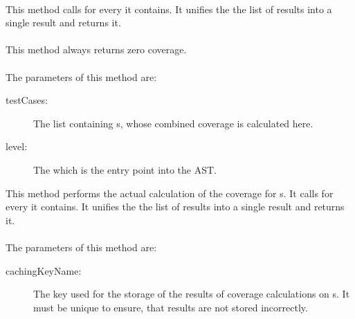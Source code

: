 \paragraph{} \label{Classes:Metrics:AbstractCoverageMetric:getCoverage_branch}
This method calls  for every  it contains. It unifies the the list of results into a single result and returns it.

\paragraph{} \label{Classes:Metrics:AbstractCoverageMetric:getCoverage_term}
This method always returns zero coverage.

\paragraph{} \label{Classes:Metrics:AbstractCoverageMetric:getCoverage_hierarchy_uncached}
The parameters of this method are:
\begin{description}
\item[testCases:] The list containing s, whose combined coverage is calculated here.

\item[level:]  The  which is the entry point into the AST.

\end{description}

This method performs the actual calculation of the coverage for s. It calls  for every  it contains. It unifies the the list of results into a single result and returns it.

\paragraph{} \label{Classes:Metrics:AbstractCoverageMetric:AbstractCoverageMetric}
The parameters of this method are:
\begin{description}
\item[cachingKeyName:] The key used for the storage of the results of coverage calculations on s. It must be unique to ensure, that results are not stored incorrectly.

\end{description}

